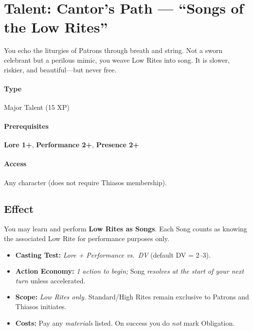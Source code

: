 \section{Talent: Cantor's Path --- ``Songs of the Low Rites''}
\label{talent:cantors-path}

\begin{tcolorbox}[colback=black!3,colframe=black!40!white,title={Cantor's Path}]
You echo the liturgies of Patrons through breath and string. Not a sworn celebrant but a perilous mimic, you weave Low Rites into song. It is slower, riskier, and beautiful---but never free.
\end{tcolorbox}

\paragraph*{Type} Major Talent (15 XP) \quad
\paragraph*{Prerequisites} \textbf{Lore 1+}, \textbf{Performance 2+}, \textbf{Presence 2+} \quad
\paragraph*{Access} Any character (does not require Thiasos membership).

\subsection*{Effect}
You may learn and perform \textbf{Low Rites as Songs}. Each Song counts as knowing the associated Low Rite for performance purposes only.

\begin{itemize}
  \item \textbf{Casting Test:} \emph{Lore + Performance vs.\ DV} (default DV = 2--3).
  \item \textbf{Action Economy:} \emph{1 action to begin;} Song \emph{resolves at the start of your next turn} unless accelerated.
  \item \textbf{Scope:} \emph{Low Rites only.} Standard/High Rites remain exclusive to Patrons and Thiasos initiates.
  \item \textbf{Costs:} Pay any \emph{materials} listed. On success you do \emph{not} mark Obligation.
\end{itemize}


